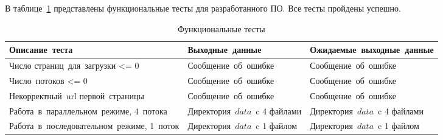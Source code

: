 
В таблице~\ref{tbl:tests} представлены функциональные тесты для разработанного ПО.
Все тесты пройдены успешно.

\begin{table}[h]
    \begin{center}
        \caption{\label{tbl:tests} Функциональные тесты}
        \begin{tabular}{|p{5cm}|p{5cm}|p{5cm}|}
            \hline
            Описание~теста & Выходные~данные & Ожидаемые~выходные~данные
            \\ \hline
            Число страниц~для~загрузки <= 0 & Сообщение~об~ошибке & Сообщение~об~ошибке
            \\ \hline
            Число~потоков <= 0 & Сообщение~об~ошибке & Сообщение~об~ошибке
            \\ \hline
            Некорректный~url первой~страницы & Сообщение~об~ошибке & Сообщение~об~ошибке
            \\ \hline
            Работа~в~параллельном~режиме, 4~потока & Директория~$data$~c 4 файлами & Директория~$data$~c 4 файлами
            \\ \hline
            Работа~в~последовательном~режиме, 1~поток & Директория~$data$~c 1 файлом & Директория~$data$~c 1 файлом
            \\ \hline
        \end{tabular}
    \end{center}
\end{table}


